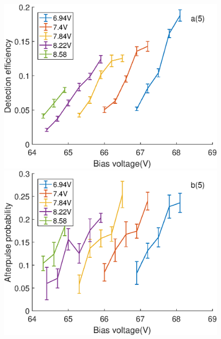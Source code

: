 \documentclass[%
 reprint,
superscriptaddress,
 amsmath,amssymb,
 aps,
]{revtex4-1}
\begin{document}
\begin{figure}
\begin{minipage}{0.24\linewidth}
\centering
\includegraphics[width = 1\textwidth]{figure/110M/efficiency.eps}%
\end{minipage}
\begin{minipage}{0.24\linewidth}
\centering
\includegraphics[width = 1\textwidth]{figure/110M/afterpulse0.eps}%
\end{minipage}
\begin{minipage}{0.24\linewidth}
\centering

\end{minipage}
\end{figure}
\end{document}
